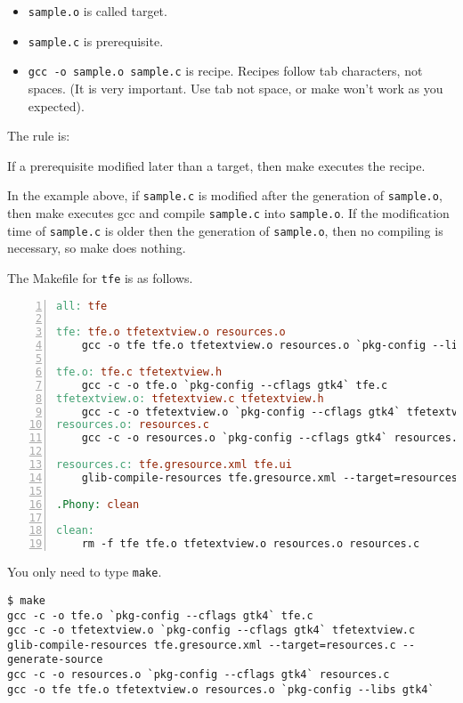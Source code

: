 \begin{itemize}
\tightlist
\item
  \passthrough{\lstinline!sample.o!} is called target.
\item
  \passthrough{\lstinline!sample.c!} is prerequisite.
\item
  \passthrough{\lstinline!gcc -o sample.o sample.c!} is recipe. Recipes
  follow tab characters, not spaces. (It is very important. Use tab not
  space, or make won't work as you expected).
\end{itemize}

The rule is:

If a prerequisite modified later than a target, then make executes the
recipe.

In the example above, if \passthrough{\lstinline!sample.c!} is modified
after the generation of \passthrough{\lstinline!sample.o!}, then make
executes gcc and compile \passthrough{\lstinline!sample.c!} into
\passthrough{\lstinline!sample.o!}. If the modification time of
\passthrough{\lstinline!sample.c!} is older then the generation of
\passthrough{\lstinline!sample.o!}, then no compiling is necessary, so
make does nothing.

The Makefile for \passthrough{\lstinline!tfe!} is as follows.

\begin{lstlisting}[language=make, numbers=left]
all: tfe

tfe: tfe.o tfetextview.o resources.o
    gcc -o tfe tfe.o tfetextview.o resources.o `pkg-config --libs gtk4`

tfe.o: tfe.c tfetextview.h
    gcc -c -o tfe.o `pkg-config --cflags gtk4` tfe.c
tfetextview.o: tfetextview.c tfetextview.h
    gcc -c -o tfetextview.o `pkg-config --cflags gtk4` tfetextview.c
resources.o: resources.c
    gcc -c -o resources.o `pkg-config --cflags gtk4` resources.c

resources.c: tfe.gresource.xml tfe.ui
    glib-compile-resources tfe.gresource.xml --target=resources.c --generate-source

.Phony: clean

clean:
    rm -f tfe tfe.o tfetextview.o resources.o resources.c
\end{lstlisting}

You only need to type \passthrough{\lstinline!make!}.

\begin{lstlisting}
$ make
gcc -c -o tfe.o `pkg-config --cflags gtk4` tfe.c
gcc -c -o tfetextview.o `pkg-config --cflags gtk4` tfetextview.c
glib-compile-resources tfe.gresource.xml --target=resources.c --generate-source
gcc -c -o resources.o `pkg-config --cflags gtk4` resources.c
gcc -o tfe tfe.o tfetextview.o resources.o `pkg-config --libs gtk4`
\end{lstlisting}

